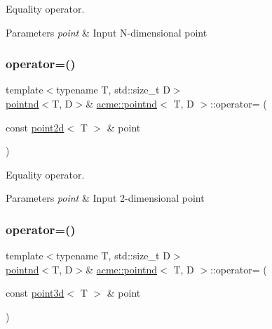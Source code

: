 Equality operator. 


\begin{DoxyParams}{Parameters}
{\em point} & Input N-\/dimensional point \\
\hline
\end{DoxyParams}
\mbox{\label{classacme_1_1pointnd_a8a548f2642065ade8e0e8666aafc448a}} 
\subsubsection{\texorpdfstring{operator=()}{operator=()}\hspace{0.1cm}{\footnotesize\ttfamily [2/3]}}
{\footnotesize\ttfamily template$<$typename T, std\+::size\+\_\+t D$>$ \\
\hyperlink{classacme_1_1pointnd}{pointnd}$<$T, D$>$\& \hyperlink{classacme_1_1pointnd}{acme\+::pointnd}$<$ T, D $>$\+::operator= (\begin{DoxyParamCaption}\item[{const \hyperlink{classacme_1_1point2d}{point2d}$<$ T $>$ \&}]{point }\end{DoxyParamCaption})\hspace{0.3cm}{\ttfamily [inline]}}



Equality operator. 


\begin{DoxyParams}{Parameters}
{\em point} & Input 2-\/dimensional point \\
\hline
\end{DoxyParams}
\mbox{\label{classacme_1_1pointnd_a90082456348fdb8303c5cf9d31abe847}} 
\subsubsection{\texorpdfstring{operator=()}{operator=()}\hspace{0.1cm}{\footnotesize\ttfamily [3/3]}}
{\footnotesize\ttfamily template$<$typename T, std\+::size\+\_\+t D$>$ \\
\hyperlink{classacme_1_1pointnd}{pointnd}$<$T, D$>$\& \hyperlink{classacme_1_1pointnd}{acme\+::pointnd}$<$ T, D $>$\+::operator= (\begin{DoxyParamCaption}\item[{const \hyperlink{classacme_1_1point3d}{point3d}$<$ T $>$ \&}]{point }\end{DoxyParamCaption})\hspace{0.3cm}{\ttfamily [inline]}}



